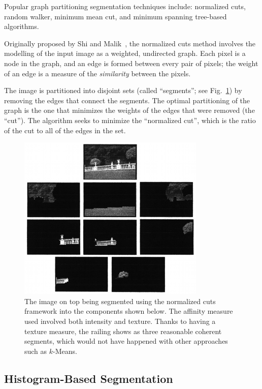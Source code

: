 Popular graph partitioning segmentation techniques include: normalized cuts, random walker, minimum mean cut, and minimum spanning tree-based algorithms.

Originally proposed by Shi and Malik~\cite{shi:1997}, the normalized cuts method involves the modelling of the input image as a weighted, undirected graph. Each pixel is a node in the graph, and an edge is formed between every pair of pixels; the weight of an edge is a measure of the \emph{similarity} between the pixels.

The image is partitioned into disjoint sets (called ``segments''; see Fig.~\ref{img:norm_cuts}) by removing the edges that connect the segments. The optimal partitioning of the graph is the one that minimizes the weights of the edges that were removed (the ``cut''). The algorithm seeks to minimize the ``normalized cut'', which is the ratio of the cut to all of the edges in the set.

\begin{figure}
\centering
\includegraphics{figures/norm_cuts}
\caption[Graph partitioning segmentation: normalized cuts]{The image on top being segmented using the normalized cuts framework into the components shown below. The affinity measure used involved both intensity and texture. Thanks to having a texture measure, the railing shows as three reasonable coherent segments, which would not have happened with other approaches such as $k$-Means.}
\label{img:norm_cuts}
\end{figure}

\subsection{Histogram-Based Segmentation}
\label{sec:histo} 

